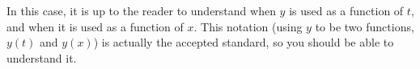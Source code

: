 \begin{solution}
In this case, it is up to the reader to understand when $y$ is used as a function of $t$, and when it is used as a function of $x$. This notation  (using $y$ to be two functions, $y(t)$ and $y(x)$) is actually the accepted standard, so you should be able to understand it.
\end{solution}





